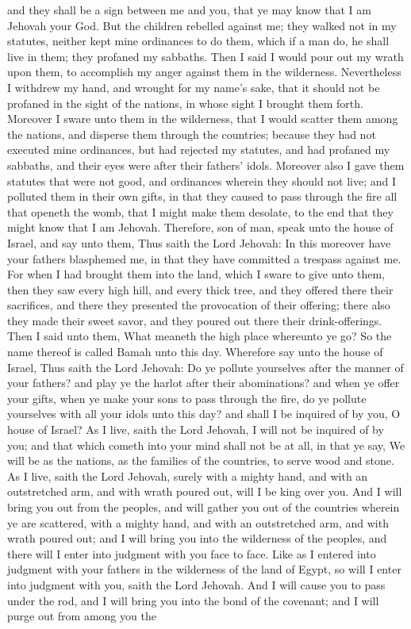 and they shall be a sign between me and you, that ye may know that I am Jehovah your God. But the children rebelled against me; they walked not in my statutes, neither kept mine ordinances to do them, which if a man do, he shall live in them; they profaned my sabbaths. Then I said I would pour out my wrath upon them, to accomplish my anger against them in the wilderness. Nevertheless I withdrew my hand, and wrought for my name’s sake, that it should not be profaned in the sight of the nations, in whose sight I brought them forth. Moreover I sware unto them in the wilderness, that I would scatter them among the nations, and disperse them through the countries; because they had not executed mine ordinances, but had rejected my statutes, and had profaned my sabbaths, and their eyes were after their fathers’ idols. Moreover also I gave them statutes that were not good, and ordinances wherein they should not live; and I polluted them in their own gifts, in that they caused to pass through the fire all that openeth the womb, that I might make them desolate, to the end that they might know that I am Jehovah.  Therefore, son of man, speak unto the house of Israel, and say unto them, Thus saith the Lord Jehovah: In this moreover have your fathers blasphemed me, in that they have committed a trespass against me. For when I had brought them into the land, which I sware to give unto them, then they saw every high hill, and every thick tree, and they offered there their sacrifices, and there they presented the provocation of their offering; there also they made their sweet savor, and they poured out there their drink-offerings. Then I said unto them, What meaneth the high place whereunto ye go? So the name thereof is called Bamah unto this day. Wherefore say unto the house of Israel, Thus saith the Lord Jehovah: Do ye pollute yourselves after the manner of your fathers? and play ye the harlot after their abominations? and when ye offer your gifts, when ye make your sons to pass through the fire, do ye pollute yourselves with all your idols unto this day? and shall I be inquired of by you, O house of Israel? As I live, saith the Lord Jehovah, I will not be inquired of by you; and that which cometh into your mind shall not be at all, in that ye say, We will be as the nations, as the families of the countries, to serve wood and stone.  As I live, saith the Lord Jehovah, surely with a mighty hand, and with an outstretched arm, and with wrath poured out, will I be king over you. And I will bring you out from the peoples, and will gather you out of the countries wherein ye are scattered, with a mighty hand, and with an outstretched arm, and with wrath poured out; and I will bring you into the wilderness of the peoples, and there will I enter into judgment with you face to face. Like as I entered into judgment with your fathers in the wilderness of the land of Egypt, so will I enter into judgment with you, saith the Lord Jehovah. And I will cause you to pass under the rod, and I will bring you into the bond of the covenant; and I will purge out from among you the 